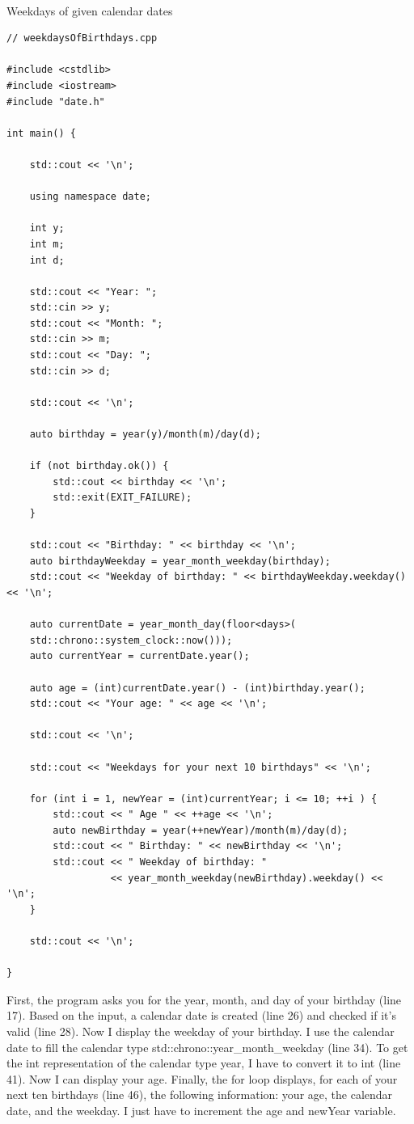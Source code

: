 \hspace*{\fill} \\ %
\noindent
Weekdays of given calendar dates
\begin{lstlisting}[style=styleCXX]
// weekdaysOfBirthdays.cpp

#include <cstdlib>
#include <iostream>
#include "date.h"

int main() {
	
	std::cout << '\n';
	
	using namespace date;
	
	int y;
	int m;
	int d;
	
	std::cout << "Year: ";
	std::cin >> y;
	std::cout << "Month: ";
	std::cin >> m;
	std::cout << "Day: ";
	std::cin >> d;
	
	std::cout << '\n';
	
	auto birthday = year(y)/month(m)/day(d);
	
	if (not birthday.ok()) {
		std::cout << birthday << '\n';
		std::exit(EXIT_FAILURE);
	}
	
	std::cout << "Birthday: " << birthday << '\n';
	auto birthdayWeekday = year_month_weekday(birthday);
	std::cout << "Weekday of birthday: " << birthdayWeekday.weekday() << '\n';
	
	auto currentDate = year_month_day(floor<days>(
	std::chrono::system_clock::now()));
	auto currentYear = currentDate.year();
	
	auto age = (int)currentDate.year() - (int)birthday.year();
	std::cout << "Your age: " << age << '\n';
	
	std::cout << '\n';
	
	std::cout << "Weekdays for your next 10 birthdays" << '\n';
	
	for (int i = 1, newYear = (int)currentYear; i <= 10; ++i ) {
		std::cout << " Age " << ++age << '\n';
		auto newBirthday = year(++newYear)/month(m)/day(d);
		std::cout << " Birthday: " << newBirthday << '\n';
		std::cout << " Weekday of birthday: "
				  << year_month_weekday(newBirthday).weekday() << '\n';
	}
	
	std::cout << '\n';
	
}
\end{lstlisting}

First, the program asks you for the year, month, and day of your birthday (line 17). Based on the input, a calendar date is created (line 26) and checked if it’s valid (line 28). Now I display the weekday of your birthday. I use the calendar date to fill the calendar type std::chrono::year\_month\_weekday (line 34). To get the int representation of the calendar type year, I have to convert it to int (line 41). Now I can display your age. Finally, the for loop displays, for each of your next ten birthdays (line 46), the following information: your age, the calendar date, and the weekday. I just have to increment the age and newYear variable.


